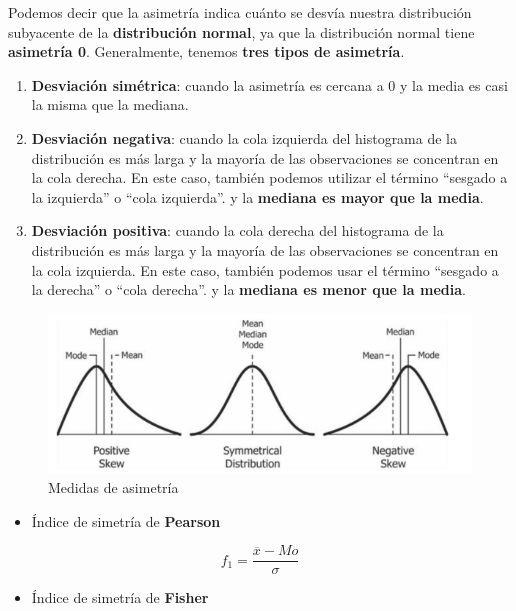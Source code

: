 \documentclass[10pt,]{krantz}
\providecommand{\tightlist}{%
  \setlength{\itemsep}{0pt}\setlength{\parskip}{0pt}}
\theoremstyle{definition}
\theoremstyle{definition}
\theoremstyle{definition}
\theoremstyle{definition}
\theoremstyle{remark}
\begin{document}
Podemos decir que la asimetría indica cuánto se desvía nuestra distribución subyacente de la \textbf{distribución normal}, ya que la distribución normal tiene \textbf{asimetría 0}. Generalmente, tenemos \textbf{tres tipos de asimetría}.

\begin{enumerate}
\def\labelenumi{\arabic{enumi}.}
\item
  \textbf{Desviación simétrica}: cuando la asimetría es cercana a 0 y la media es casi la misma que la mediana.
\item
  \textbf{Desviación negativa}: cuando la cola izquierda del histograma de la distribución es más larga y la mayoría de las observaciones se concentran en la cola derecha. En este caso, también podemos utilizar el término ``sesgado a la izquierda'' o ``cola izquierda''. y la \textbf{mediana es mayor que la media}.
\item
  \textbf{Desviación positiva}: cuando la cola derecha del histograma de la distribución es más larga y la mayoría de las observaciones se concentran en la cola izquierda. En este caso, también podemos usar el término ``sesgado a la derecha'' o ``cola derecha''. y la \textbf{mediana es menor que la media}.
\end{enumerate}

\begin{figure}
\centering
\includegraphics{simetria.png}
\caption{Medidas de asimetría}
\end{figure}

\begin{itemize}
\tightlist
\item
  Índice de simetría de \textbf{Pearson}
\end{itemize}

\[f_1=\frac{\overline{x}-Mo}{\sigma} \]

\begin{itemize}
\tightlist
\item
  Índice de simetría de \textbf{Fisher}
\end{itemize}
\end{document}
